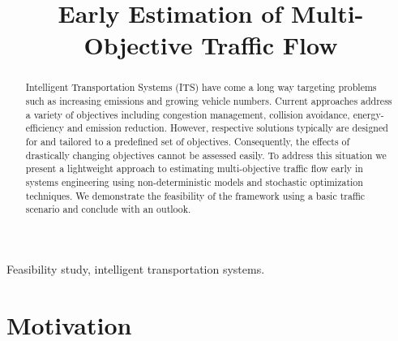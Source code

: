 \documentclass[conference]{../cls/IEEEtran}
\begin{document}
\title{Early Estimation of Multi-Objective Traffic Flow}

\author{
	\and
}

\maketitle

\begin{abstract}
Intelligent Transportation Systems (ITS) have come a long way targeting problems such as increasing emissions and growing vehicle numbers. Current approaches address a variety of objectives including congestion management, collision avoidance, energy-efficiency and emission reduction. However, respective solutions typically are designed for and tailored to a predefined set of objectives. Consequently, the effects of drastically changing objectives cannot be assessed easily. To address this situation we present a lightweight approach to estimating multi-objective traffic flow early in systems engineering using non-deterministic models and stochastic optimization techniques. We demonstrate the feasibility of the framework using a basic traffic scenario and conclude with an outlook.
\end{abstract}

\begin{IEEEkeywords}
Feasibility study, intelligent transportation systems.
\end{IEEEkeywords}

\section{Motivation}
\label{sec:motivation}
\end{document}

